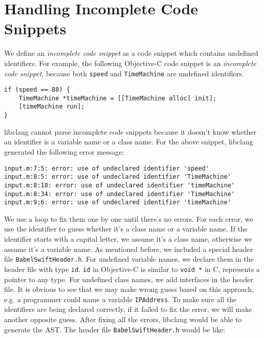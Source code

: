 \documentclass{sfuthesis}
\begin{document}

\section{Handling Incomplete Code Snippets}

We define an \emph{incomplete code snippet} as a code snippet which contains undefined identifiers. For example, the following Objective-C code snippet is an \emph{incomplete code snippet}, because both \texttt{speed} and \texttt{TimeMachine} are undefined identifiers.

\begin{lstlisting}[frame=single]
if (speed == 88) {
    TimeMachine *timeMachine = [[TimeMachine alloc] init];
    [timeMachine run];
}
\end{lstlisting}

libclang cannot parse incomplete code snippets because it doesn't know whether an identifier is a variable name or a class name. For the above snippet, libclang generated the following error message:

\begin{lstlisting}[frame=single]
input.m:7:5: error: use of undeclared identifier 'speed'
input.m:8:5: error: use of undeclared identifier 'TimeMachine'
input.m:8:18: error: use of undeclared identifier 'timeMachine'
input.m:8:34: error: use of undeclared identifier 'TimeMachine'
input.m:9:6: error: use of undeclared identifier 'timeMachine'
\end{lstlisting}

We use a loop to fix them one by one until there's no errors. For each error, we use the identifier to guess whether it's a class name or a variable name. If the identifier starts with a capital letter, we assume it's a class name, otherwise we assume it's a variable name.
As mentioned before, we included a special header file \texttt{BabelSwiftHeader.h}. For undefined variable names, we declare them in the header file with type \texttt{id}. \texttt{id} in Objective-C is similar to \texttt{void *} in C, represents a pointer to any type. For undefined class names, we add interfaces in the header file. It is obvious to see that we may make wrong guess based on this approach, e.g. a programmer could name a variable \texttt{IPAddress}. To make sure all the identifiers are being declared correctly, if it failed to fix the error, we will make another opposite guess. After fixing all the errors, libclang would be able to generate the AST. The header file \texttt{BabelSwiftHeader.h} would be like:
\end{document}
